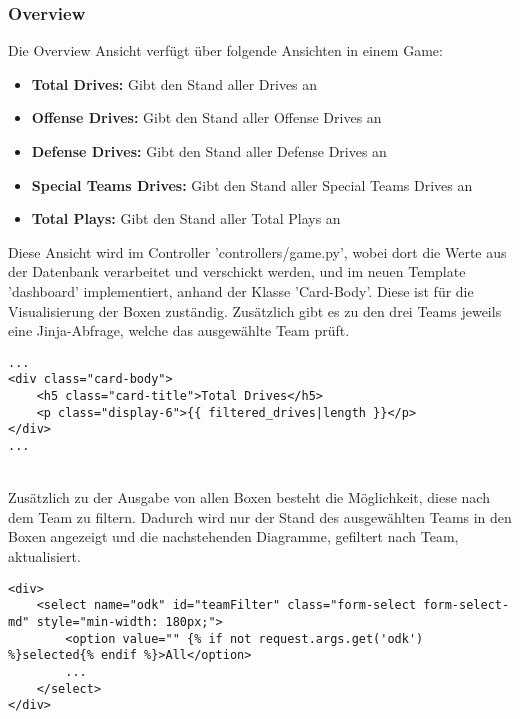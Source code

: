 \subsubsection{Overview}
Die Overview Ansicht verfügt über folgende Ansichten in einem Game:
\begin{itemize}
    \item \textbf{Total Drives:} Gibt den Stand aller Drives an
    \item \textbf{Offense Drives:} Gibt den Stand aller Offense Drives an
    \item \textbf{Defense Drives:} Gibt den Stand aller Defense Drives an
    \item \textbf{Special Teams Drives:} Gibt den Stand aller Special Teams Drives an
    \item \textbf{Total Plays:} Gibt den Stand aller Total Plays an
\end{itemize}
\noindent
Diese Ansicht wird im Controller 'controllers/game.py', wobei dort die Werte aus der Datenbank verarbeitet und verschickt werden, und im neuen Template 'dashboard' implementiert, anhand der Klasse 'Card-Body'. Diese ist für die Visualisierung der Boxen zuständig. Zusätzlich gibt es zu den drei Teams jeweils eine Jinja-Abfrage, welche das ausgewählte Team prüft.  
\begin{verbatim}
...
<div class="card-body">
    <h5 class="card-title">Total Drives</h5>
    <p class="display-6">{{ filtered_drives|length }}</p>
</div>
...
\end{verbatim}
\noindent
\\
Zusätzlich zu der Ausgabe von allen Boxen besteht die Möglichkeit, diese nach dem Team zu filtern. Dadurch wird nur der Stand des ausgewählten Teams in den Boxen angezeigt und die nachstehenden Diagramme, gefiltert nach Team, aktualisiert.
\begin{verbatim}
<div>
    <select name="odk" id="teamFilter" class="form-select form-select-md" style="min-width: 180px;">
        <option value="" {% if not request.args.get('odk') %}selected{% endif %}>All</option>
        ...
    </select>
</div>
\end{verbatim}
